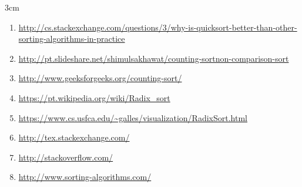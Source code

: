 \documentclass[fleqn,10pt]{SelfArx} %
\begin{document}
\begin{adjustwidth}{}{3cm}
\begin{enumerate}
\item \url{http://cs.stackexchange.com/questions/3/why-is-quicksort-better-than-other-sorting-algorithms-in-practice}\label{stackquick}
\item \url{http://pt.slideshare.net/shimulsakhawat/counting-sortnon-comparison-sort} 
\item \url{http://www.geeksforgeeks.org/counting-sort/} 
\item \url{https://pt.wikipedia.org/wiki/Radix_sort}
\item \url{https://www.cs.usfca.edu/~galles/visualization/RadixSort.html}
\item \url{http://tex.stackexchange.com/} 
\item \url{http://stackoverflow.com/} 
\item \url{http://www.sorting-algorithms.com/} 
\end{enumerate}
\end{adjustwidth}
\end{document}

